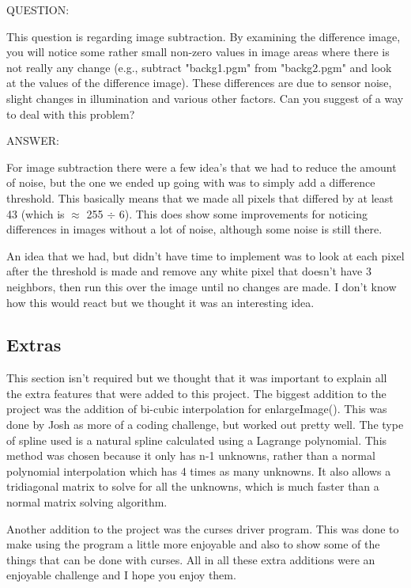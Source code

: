 \documentclass[pdftex, 11pt]{article}
\begin{document}
		\begin{description}

			\item{QUESTION:}
			
				This question is regarding image subtraction. By examining the difference image,
				you will notice some rather small non-zero values in image areas where there is not really any
				change (e.g., subtract "backg1.pgm" from "backg2.pgm" and look at the values of the difference
				image). These differences are due to sensor noise, slight changes in illumination and various
				other factors. Can you suggest of a way to deal with this problem?

			\item{ANSWER:}

				For image subtraction there were a few idea's that we had to reduce the amount of noise, but the
				one we ended up going with was to simply add a difference threshold.  This basically means that
				we made all pixels that differed by at least 43 (which is $\approx$ 255 $\div$ 6).  This does
				show some improvements for noticing differences in images without a lot of noise, although some
				noise is still there.

				An idea that we had, but didn't have time to implement was to look at each pixel after the threshold
				is made and remove any white pixel that doesn't have 3 neighbors, then run this over the image until
				no changes are made.  I don't know how this would react but we thought it was an interesting idea.

		\end{description}
	
	\subsection{Extras}

		\begin{description}

			This section isn't required but we thought that it was important to explain all the extra features that
			were added to this project.  The biggest addition to the project was the addition of bi-cubic interpolation
			for enlargeImage().  This was done by Josh as more of a coding challenge, but worked out pretty well.  The
			type of spline used is a natural spline calculated using a Lagrange polynomial.  This method was chosen
			because it only has n-1 unknowns, rather than a normal polynomial interpolation which has 4 times as many
			unknowns.  It also allows a tridiagonal matrix to solve for all the unknowns, which is much faster than
			a normal matrix solving algorithm.

			Another addition to the project was the curses driver program.  This was done to make using the program a
			little more enjoyable and also to show some of the things that can be done with curses.  All in all these
			extra additions were an enjoyable challenge and I hope you enjoy them.

		\end{description}
\end{document}
